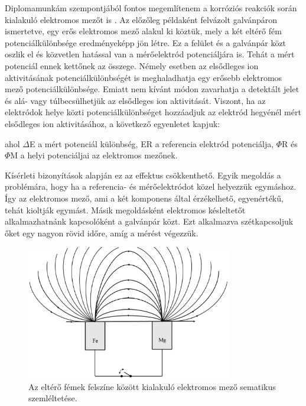 Diplomamunkám szempontjából fontos megemlítenem a korróziós reakciók során kialakuló elektromos mezőt is \cite{kiss2017effect}. Az előzőleg példaként felvázolt galvánpáron ismertetve, egy erős elektromos mező alakul ki köztük, mely a két eltérő fém potenciálkülönbsége eredményeképp jön létre. Ez a felület és a galvánpár közt oszlik el és közvetlen hatással van a mérőelektród potenciáljára is. Tehát a mért potenciál ennek kettőnek az összege. Némely esetben az elsődleges ion aktivitásának potenciálkülönbségét is meghaladhatja egy erősebb elektromos mező potenciálkülönbsége. Emiatt nem kívánt módon zavarhatja a detektált jelet és alá- vagy túlbecsülhetjük az elsődleges ion aktivitását. Viszont, ha az elektródok helye közti potenciálkülönbséget hozzáadjuk az elektród hegyénél mért elsődleges ion aktivitásához, a következő egyenletet kapjuk:

ahol $\Delta$E a mért potenciál különbség, ER a referencia elektród potenciálja, $\Phi$R és $\Phi$M a helyi potenciáljai az elektromos mezőnek. 

Kísérleti bizonyítások alapján ez az effektus csökkenthető. Egyik megoldás a problémára, hogy ha a referencia- és mérőelektródot közel helyezzük egymáshoz. Így az elektromos mező, ami a két komponens által érzékelhető, egyenértékű, tehát kioltják egymást. Másik megoldásként elektromos késleltetőt alkalmazhatnánk kapcsolóként a galvánpár közt. Ezt alkalmazva szétkapcsoljuk őket egy nagyon rövid időre, amíg a mérést végezzük.

\begin{figure}
\centering
\includegraphics[width=0.8\textwidth]{img/field.eps}
\caption{Az eltérő fémek felszíne között kialakuló elektromos mező sematikus szemléltetése.}
\label{fig:field}
\end{figure}




